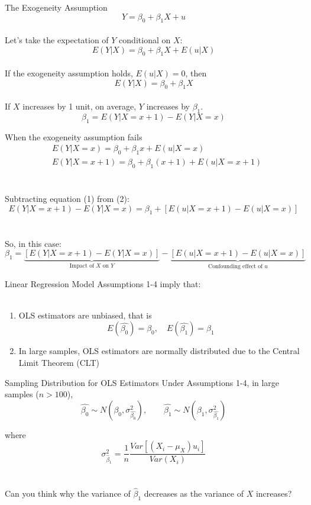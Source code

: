 \documentclass{./../div_teaching_slides}
\begin{document}
\begin{frame}{The Exogeneity Assumption}
\vspace{-1em}
$$ Y = \beta_0 + \beta_1 X + u $$ \\ \vspace{0.5em}
Let's take the expectation of $Y$ conditional on $X$: 
$$ E(Y | X) = \beta_0 + \beta_1 X + E(u|X) $$ \\ \vspace{0.5em}
If the exogeneity assumption holds, $E(u|X)=0$, then
$$ E(Y | X) = \beta_0 + \beta_1 X  $$ \\ \vspace{0.5em}
If $X$ increases by 1 unit, on average, $Y$ increases by $\beta_1$. $$  \beta_1 =  E(Y | X=x+1)  -  E(Y | X=x)$$
\end{frame}



\begin{frame}{When the exogeneity assumption fails}
\vspace{-1.5em}
\begin{align}
	 & E(Y|X=x) = \beta_0 + \beta_1 x + E(u|X=x) \\ 
	 & E(Y|X=x+1) = \beta_0 + \beta_1 (x+1) + E(u|X=x+1) 
\end{align} \\~\\
Subtracting equation (1) from (2):
$$ E(Y|X=x+1)-E(Y|X=x) = \beta_1 + [E(u|X=x+1)-E(u|X=x)] $$ \\~\\
So, in this case:
$$  \beta_1 =  \underbrace{[E(Y | X=x+1)-E(Y | X=x)]}_{\text{Impact of $X$ on $Y$}} - \underbrace{[E(u|X=x+1)-E(u|X=x)]}_{\text{Confounding effect of $u$}}$$
\end{frame}

\begin{frame}{Linear Regression Model}
Assumptions 1-4 imply that: \\~\\
\begin{enumerate}
  \item OLS estimators are unbiased, that is
$$ E(\hat{\beta_0}) = \beta_0, \quad  E(\hat{\beta_1}) = \beta_1 $$ 
\item In large samples, OLS estimators are normally distributed due to the Central Limit Theorem (CLT)
\end{enumerate}
\end{frame}
  
\begin{frame}{Sampling Distribution for OLS Estimators}
Under Assumptions 1-4, in large samples ($n>100$), 
 $$ \hat{\beta_0} \sim N(\beta_0, \sigma^2_{\hat{\beta_0}}), \quad \quad  \hat{\beta_1} \sim N(\beta_1, \sigma^2_{\hat{\beta_1}}) $$
 
 where $$ \sigma^2_{\hat{\beta}_1} = \frac{1}{n} \frac{Var[(X_i-\mu_X)u_i]}{Var(X_i)} $$	\pause \\~\\

 Can you think why the variance of $\hat{\beta}_1$ decreases as the variance of $X$ increases?
\end{frame}
\end{document}
